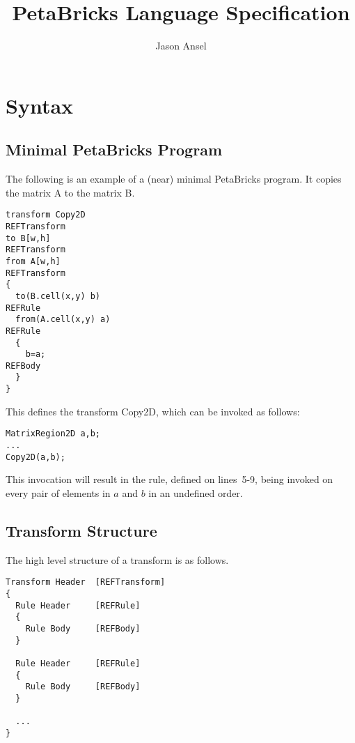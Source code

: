 \documentclass[11pt]{article}
\begin{document}
\title{PetaBricks Language Specification}
\author{Jason Ansel}
\maketitle
\tableofcontents

\newpage
\section{Syntax}

\subsection{Minimal PetaBricks Program}

The following is an example of a (near) minimal PetaBricks program. It
copies the matrix A to the matrix B.

\begin{lstlisting}
transform Copy2D                                                 REFTransform
to B[w,h]                                                        REFTransform
from A[w,h]                                                      REFTransform
{
  to(B.cell(x,y) b)                                              REFRule
  from(A.cell(x,y) a)                                            REFRule  
  {                                          
    b=a;                                                         REFBody
  }                                         
}
\end{lstlisting}
This defines the transform Copy2D, which can be invoked as follows:

\begin{lstlisting}
MatrixRegion2D a,b;
...
Copy2D(a,b);
\end{lstlisting}

This invocation will result in the rule, defined on lines~5-9, being invoked
on every pair of elements in $a$ and $b$ in an undefined order.

\subsection{Transform Structure}

The high level structure of a transform is as follows.

\begin{lstlisting}
Transform Header  [REFTransform]
{
  Rule Header     [REFRule] 
  {                       
    Rule Body     [REFBody]
  }                      
  
  Rule Header     [REFRule] 
  {                       
    Rule Body     [REFBody]
  }                                         

  ...
}
\end{lstlisting}
\end{document}
